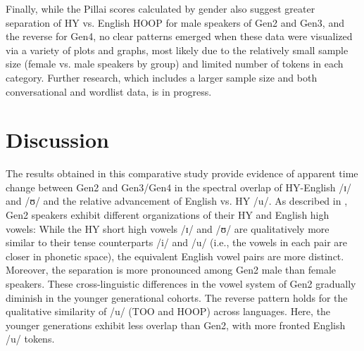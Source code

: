 \documentclass[output=paper]{langsci/langscibook}
\begin{document}
Finally, while the Pillai scores calculated by gender also suggest greater separation of HY vs. English HOOP for male speakers of Gen2 and Gen3, and the reverse for Gen4, no clear patterns emerged when these data were visualized via a variety of plots and graphs, most likely due to the relatively small sample size (female vs. male speakers by group) and limited number of tokens in each category. Further research, which includes a larger sample size and both conversational and wordlist data, is in progress. 


\section{Discussion} 
\label{sec:nove:5}

The results obtained in this comparative study provide evidence of apparent time change between Gen2 and Gen3/Gen4 in the spectral overlap of HY-English /ɪ/ and /ʊ/ and the relative advancement of English vs. HY /u/. As described in , Gen2 speakers exhibit different organizations of their HY and English high vowels: While the HY short high vowels /ɪ/ and /ʊ/ are qualitatively more similar to their tense counterparts /i/ and /u/ (i.e., the vowels in each pair are closer in phonetic space), the equivalent English vowel pairs are more distinct. Moreover, the separation is more pronounced among Gen2 male than female speakers. These cross-linguistic differences in the vowel system of Gen2 gradually diminish in the younger generational cohorts. The reverse pattern holds for the qualitative similarity of /u/ (TOO and HOOP) across languages. Here, the younger generations exhibit less overlap than Gen2, with more fronted English /u/ tokens.
\end{document}
